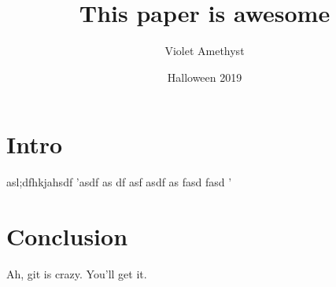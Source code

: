 \documentclass{article}
\title{This paper is awesome}
\date{Halloween 2019}
\author{Violet Amethyst}
\begin{document}
\maketitle


\section{Intro}

asl;dfhkjahsdf
'asdf
as
df
asf
asdf
as
fasd
fasd
'

\section{Conclusion}

Ah, git is crazy.  You'll get it.
\end{document}
